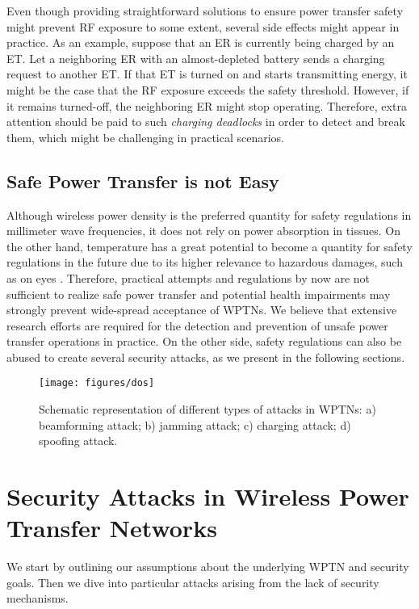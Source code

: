 \documentclass[journal,10pt,draftclsnofoot,onecolumn]{IEEEtran}
\begin{document}
Even though providing straightforward solutions to ensure power transfer safety might prevent RF exposure to some extent, several side effects might appear in practice. As an example, suppose that an ER is currently being charged by an ET. Let a neighboring ER with an almost-depleted battery sends a charging request to another ET. If that ET is turned on and starts transmitting energy, it might be the case that the RF exposure exceeds the safety threshold. However, if it remains turned-off, the neighboring ER might stop operating. Therefore, extra attention should be paid to such \emph{charging deadlocks} in order to detect and break them, which might be challenging in practical scenarios.

\subsection{Safe Power Transfer is not Easy}
\label{subsec:safety not easy}

Although wireless power density is the preferred quantity for safety regulations in millimeter wave frequencies, it does not rely on power absorption in tissues. On the other hand, temperature has a great potential to become a quantity for 
safety regulations in the future due to its higher relevance to hazardous damages, such as on eyes \cite{safe_generations_2015}. Therefore, practical attempts and regulations by now are not sufficient to realize safe power transfer and potential health impairments may strongly prevent wide-spread acceptance of WPTNs. We believe that extensive research efforts are required for the detection and prevention of unsafe power transfer operations in practice. On the other side, safety regulations can also be abused to create several security attacks, as we present in the following sections.

\begin{figure*}
\centering\texttt{[image: figures/dos]}
\caption{\label{fig:dos}Schematic representation of different types of attacks in WPTNs: a) beamforming attack; b) jamming attack; c) charging attack; d) spoofing attack.}
\end{figure*}

\section{Security Attacks in Wireless Power Transfer Networks}

We start by outlining our assumptions about the underlying WPTN and security goals. Then we dive into particular attacks arising from the lack of security mechanisms. 
\end{document}
